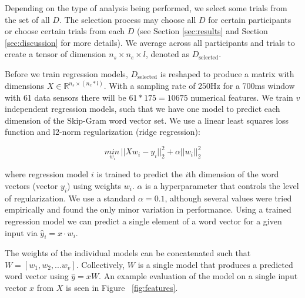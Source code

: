   Depending on the type of analysis being performed, we select some trials from the set of all $D$. The selection process may choose all $D$ for certain participants or choose certain trials from each $D$ (see Section \ref{sec:results} and Section \ref{sec:discussion} for more details). We average across all participants and trials to create a tensor of dimension $n_s \times n_e \times l$, denoted as $D_\text{selected}$.  
  
  

  Before we train regression models, $D_{\text{selected}}$ is reshaped to produce a matrix with dimensions $X \in \mathbb{R}^{n_s \times (n_e * l)}$.  With a sampling rate of 250Hz for a 700ms window with 61 data sensors there will be $61*175 = 10675$ numerical features. We train $v$ independent regression models, such that we have one model to predict each dimension of the Skip-Gram word vector set. We use a linear least squares loss function and l2-norm regularization (ridge regression):

  \begin{equation}
    \underset{w_i}{min\,} {|| X w_i - y_i||_2^2 + \alpha ||w_i||_2^2}
    \label{eq:ridge}
  \end{equation}
  
  \noindent where regression model $i$ is trained to predict the $i$th dimension of the word vectors (vector $y_i$) using weights $w_i$. $\alpha$ is a hyperparameter that controls the level of regularization. We use a standard $\alpha = 0.1$, although several values were tried empirically and found the only minor variation in performance. Using a trained regression model we can predict a single element of a word vector for a given input via $\hat{y}_i = x \cdot w_i$.
  
  The weights of the individual models can be concatenated such that $W = [ w_1, w_2, ... w_v ]$. Collectively, $W$ is a single model that produces a predicted word vector using $\hat{y} = xW$. An example evaluation of the model on a single input vector $x$ from $X$ is seen in Figure ~\ref{fig:features}.

